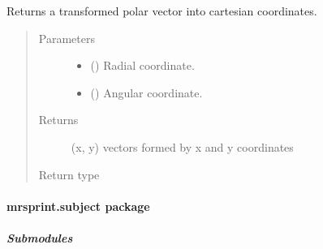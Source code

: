 \documentclass[a4paper,10pt,english]{sphinxmanual}
\begin{document}
\begin{fulllineitems}
\label{\detokenize{autodoc/mrsprint/mrsprint.simulator:mrsprint.simulator.transform_pol_to_cart}}
Returns a transformed polar vector into cartesian coordinates.
\begin{quote}\begin{description}
\item[{Parameters}] \leavevmode\begin{itemize}
\item {} 
 () \textendash{} Radial coordinate.

\item {} 
 () \textendash{} Angular coordinate.

\end{itemize}

\item[{Returns}] \leavevmode
(x, y) vectors formed by x and y coordinates

\item[{Return type}] \leavevmode
{}

\end{description}\end{quote}

\end{fulllineitems}



\paragraph{mrsprint.subject package}
\label{\detokenize{autodoc/mrsprint/mrsprint.subject:mrsprint-subject-package}}\label{\detokenize{autodoc/mrsprint/mrsprint.subject::doc}}

\subparagraph{Submodules}
\label{\detokenize{autodoc/mrsprint/mrsprint.subject:submodules}}
\end{document}
